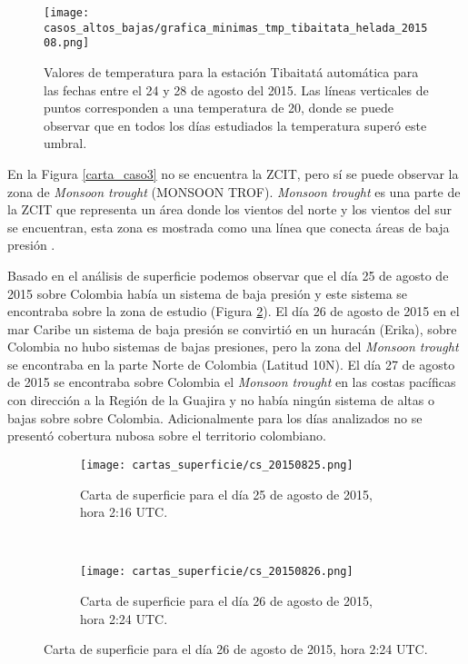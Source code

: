 \begin{itemize}
\begin{figure}[H]
    \centering
    \caption{Valores de temperatura para la estación Tibaitatá automática para las fechas entre el 24 y 28 de agosto del 2015. Las líneas verticales de puntos corresponden a una temperatura de 20\celsius, donde se puede observar que en todos los días estudiados la temperatura superó este umbral.}
    \texttt{[image: casos\_altos\_bajas/grafica\_minimas\_tmp\_tibaitata\_helada\_201508.png]}
    \label{fig:tmp_autom_Tibaitatá_201508}
\end{figure}

En la Figura \ref{carta_caso3} no se encuentra la ZCIT, pero sí se puede observar la zona de \textit{Monsoon trought} (MONSOON TROF). \textit{Monsoon trought} es una parte de la ZCIT que representa un área donde los vientos del norte y los vientos del sur se encuentran, esta zona es mostrada como una línea que conecta áreas de baja presión \citep{Wang2006}.

Basado en el análisis de superficie podemos observar que el día 25 de agosto de 2015 sobre Colombia había un sistema de baja presión y este sistema se encontraba sobre la zona de estudio (Figura \ref{carta_caso3_20150825}). El día 26 de agosto de 2015 en el mar Caribe un sistema de baja presión se convirtió en un huracán (Erika), sobre Colombia no hubo sistemas de bajas presiones, pero la zona del \textit{Monsoon trought} se encontraba en la parte Norte de Colombia (Latitud 10\degree N). El día 27 de agosto de 2015 se encontraba sobre Colombia el \textit{Monsoon trought} en las costas pacíficas con dirección a la Región de la Guajira y no había ningún sistema de altas o bajas sobre sobre Colombia. Adicionalmente para los días analizados no se presentó cobertura nubosa sobre el territorio colombiano.\\



\begin{figure}[H]
\begin{subfigure}[normla]{0.5\textwidth}
\caption{Carta de superficie para el día 25 de agosto de 2015, hora 2:16 UTC.}
\texttt{[image: cartas\_superficie/cs\_20150825.png]}
\label{carta_caso3_20150825}
\end{subfigure}
~
\begin{subfigure}[normla]{0.5\textwidth}
\caption{Carta de superficie para el día 26 de agosto de 2015, hora 2:24 UTC.}
\texttt{[image: cartas\_superficie/cs\_20150826.png]}
\label{carta_caso3_20150826}
\end{subfigure}


\end{figure}
\end{itemize}

